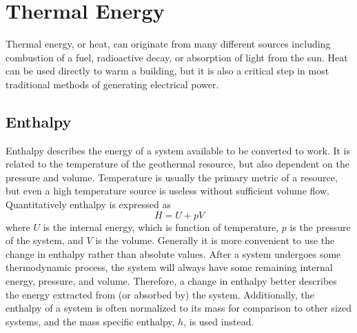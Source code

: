 \section{Thermal Energy}
Thermal energy, or heat, can originate from many different sources including combustion of a fuel, radioactive decay, or absorption of light from the sun. Heat can be used directly to warm a building, but it is also a critical step in most traditional methods of generating electrical power. 

\subsection{Enthalpy}
Enthalpy describes the energy of a system available to be converted to work. It is related to the temperature of the geothermal resource, but also dependent on the pressure and volume. Temperature is usually the primary metric of a resource, but even a high temperature source is useless without sufficient volume flow. Quantitatively enthalpy is expressed as \cite{Nellis2009}%
\begin{equation}
H = U + pV
\end{equation}
where $U$ is the internal energy, which is function of temperature, $p$ is the pressure of the system, and $V$ is the volume. Generally it is more convenient to use the change in enthalpy rather than absolute values. After a system undergoes some thermodynamic process, the system will always have some remaining internal energy, pressure, and volume. Therefore, a change in enthalpy better describes the energy extracted from (or absorbed by) the system.
Additionally, the enthalpy of a system is often normalized to its mass for comparison to other sized systems, and the mass specific enthalpy, $h$, is used instead.


